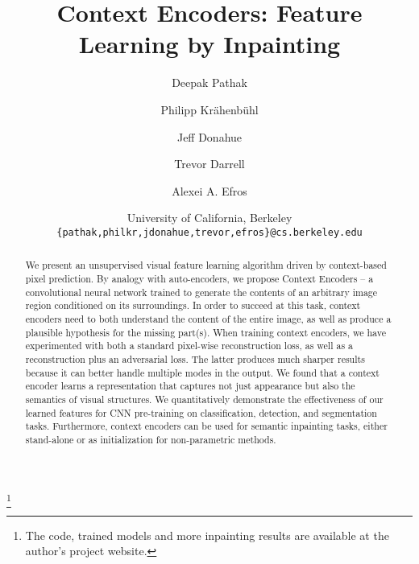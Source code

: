 \documentclass[10pt,twocolumn,letterpaper]{article}
\newcommand\blfootnote[1]{%
\begingroup
\renewcommand\thefootnote{}\footnote{#1}%
\addtocounter{footnote}{-1}%
\endgroup
}
\begin{document}
%
\title{Context Encoders: Feature Learning by Inpainting}

\author{Deepak Pathak
\and
Philipp Kr\"ahenb\"uhl
\and
Jeff Donahue
\and
Trevor Darrell
\and
Alexei A. Efros\\
\and
University of California, Berkeley\\
{\tt\small \{pathak,philkr,jdonahue,trevor,efros\}@cs.berkeley.edu}
}

\maketitle
%

%
\begin{abstract}
We present an unsupervised visual feature learning algorithm driven by context-based pixel prediction.
%
By analogy with auto-encoders, we propose Context Encoders -- a convolutional neural network trained to generate the contents of an arbitrary image region conditioned on its surroundings.
In order to succeed at this task, context encoders need to both understand the content of the entire image, as well as produce a plausible hypothesis for the missing part(s).
%
%
%
%
When training context encoders, we have experimented with
both a standard pixel-wise reconstruction loss, as well as a reconstruction plus an adversarial loss.  The latter produces much sharper results because it can better handle multiple modes in the output.
%
We found that a context encoder learns a representation that captures not just appearance but also the semantics of visual structures.
%
We quantitatively demonstrate the effectiveness of our learned features for CNN pre-training on classification, detection, and segmentation tasks.
Furthermore, context encoders can be used for semantic inpainting tasks, either stand-alone or as initialization for non-parametric methods.

%
%
%

%

%
\end{abstract}

\blfootnote{The code, trained models and more inpainting results are available at the author's project website.}

%
\end{document}
